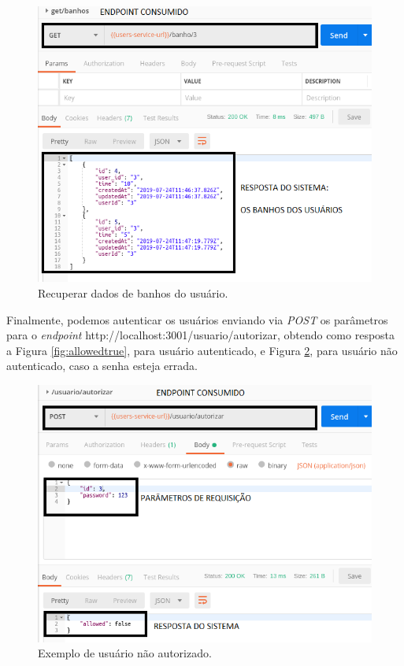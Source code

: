 \begin{figure}[htbp]
	\centering
	\includegraphics[width=0.7\linewidth]{figuras/postman/getbanhos.png}
	\caption{Recuperar dados de banhos do usuário.}
	\label{fig:banhos}
\end{figure}

Finalmente, podemos autenticar os usuários enviando via \textit{POST} os parâmetros para o \textit{endpoint} http://localhost:3001/usuario/autorizar, obtendo como resposta a Figura \ref{fig:allowedtrue}, para usuário autenticado, e Figura \ref{fig:allowedfalse}, para usuário não autenticado, caso a senha esteja errada.

\begin{figure}[htbp]
	\centering
	\includegraphics[width=0.7\linewidth]{figuras/postman/allowedfalse.png}
	\caption{Exemplo de usuário não autorizado.}
	\label{fig:allowedfalse}
\end{figure}

